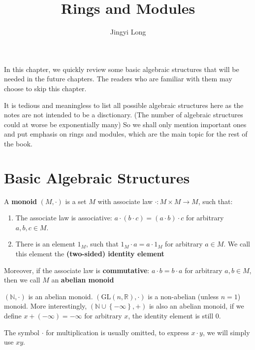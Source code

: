 \documentclass{note-eng}
\title{Rings and Modules}
\author{Jingyi Long}
\begin{document}
\maketitle
\tableofcontents


In this chapter, we quickly review some basic algebraic structures that will be needed in the future chapters. The readers who are familiar with them may choose to skip this chapter.

It is tedious and meaningless to list all possible algebraic structures here as the notes are not intended to be a disctionary. (The number of algebraic structures could at worse be exponentially many) So we shall only mention important ones and put emphasis on rings and modules, which are the main topic for the rest of the book.

\newpage

\section{Basic Algebraic Structures}

\begin{definition}
    A \textbf{monoid} $(M, \cdot)$ is a set $M$ with associate law $\cdot: M \times M \rightarrow M$, such that:
    \begin{enumerate}
        \item The associate law is associative: $a \cdot (b \cdot c) = (a \cdot b) \cdot c$ for arbitrary $a, b, c \in M$.
        \item There is an element $1_M$, such that $1_M \cdot a = a \cdot 1_M$ for arbitrary $a \in M$. We call this element the \textbf{(two-sided) identity element}
    \end{enumerate}
    Moreover, if the associate law is \textbf{commutative}: $a \cdot b = b \cdot a$ for arbitrary $a, b \in M$, then we call $M$ an \textbf{abelian monoid}
\end{definition}

\begin{example}
    $(\mathbb{N}, \cdot)$ is an abelian monoid. $(\mathrm{GL}(n, \mathbb{R}), \cdot)$ is a non-abelian (unless $n = 1$) monoid. More interestingly, $(\mathbb{N} \cup \left\lbrace -\infty \right\rbrace, +)$ is also an abelian monoid, if we define $x + (-\infty) = -\infty$ for arbitrary $x$, the identity element is still $0$.
\end{example}

The symbol $\cdot$ for multiplication is usually omitted, to express $x \cdot y$, we will simply use $xy$.
\end{document}
